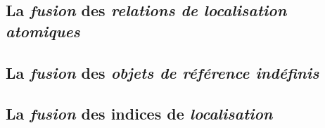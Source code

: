 

\subsection{La \emph{fusion} des \emph{relations de localisation
atomiques}}

\subsection{La \emph{fusion} des \emph{objets de référence indéfinis}}

\subsection{La \emph{fusion} des indices de \emph{localisation}}


